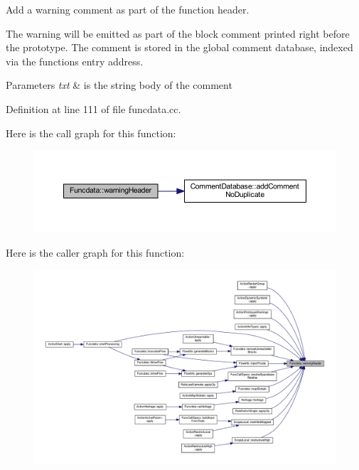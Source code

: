 Add a warning comment as part of the function header. 

The warning will be emitted as part of the block comment printed right before the prototype. The comment is stored in the global comment database, indexed via the function\textquotesingle{}s entry address. 
\begin{DoxyParams}{Parameters}
{\em txt} & is the string body of the comment \\
\hline
\end{DoxyParams}


Definition at line 111 of file funcdata.\+cc.

Here is the call graph for this function\+:
\nopagebreak
\begin{figure}[H]
\begin{center}
\leavevmode
\includegraphics[width=350pt]{class_funcdata_a87967b12187406a7fdf311cc4b836118_cgraph}
\end{center}
\end{figure}
Here is the caller graph for this function\+:
\nopagebreak
\begin{figure}[H]
\begin{center}
\leavevmode
\includegraphics[width=350pt]{class_funcdata_a87967b12187406a7fdf311cc4b836118_icgraph}
\end{center}
\end{figure}


